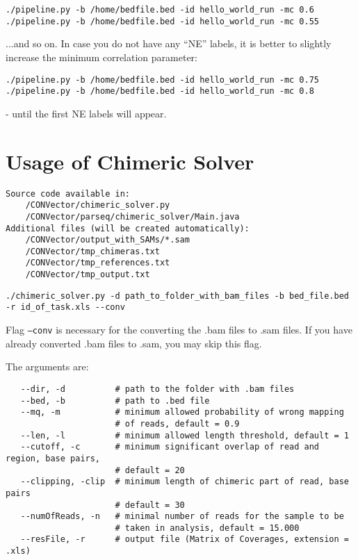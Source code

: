 \documentclass{article}
\begin{document}
\begin{lstlisting}[style=DOS, caption={Decreasing of correlation}]
./pipeline.py -b /home/bedfile.bed -id hello_world_run -mc 0.6
./pipeline.py -b /home/bedfile.bed -id hello_world_run -mc 0.55
\end{lstlisting}

...and so on. In case you do not have any ``NE'' labels, it is better to slightly increase the minimum correlation parameter:

\begin{lstlisting}[style=DOS, caption={Increasing of correlation}]
./pipeline.py -b /home/bedfile.bed -id hello_world_run -mc 0.75
./pipeline.py -b /home/bedfile.bed -id hello_world_run -mc 0.8
\end{lstlisting}
- until the first NE labels will appear.







\newpage

\section{Usage of Chimeric Solver}
\begin{verbatim}
Source code available in:
    /CONVector/chimeric_solver.py
    /CONVector/parseq/chimeric_solver/Main.java
Additional files (will be created automatically):
    /CONVector/output_with_SAMs/*.sam
    /CONVector/tmp_chimeras.txt
    /CONVector/tmp_references.txt
    /CONVector/tmp_output.txt
\end{verbatim}

\begin{lstlisting}[style=DOS, caption={Simple run of Chimeric Solver}]
./chimeric_solver.py -d path_to_folder_with_bam_files -b bed_file.bed -r id_of_task.xls --conv
\end{lstlisting}

Flag \texttt{--conv} is necessary for the converting the .bam files to .sam files. If you have already converted .bam files to .sam, you may skip this flag.

The arguments are:

\begin{verbatim}
   --dir, -d          # path to the folder with .bam files
   --bed, -b          # path to .bed file
   --mq, -m           # minimum allowed probability of wrong mapping
                      # of reads, default = 0.9
   --len, -l          # minimum allowed length threshold, default = 1
   --cutoff, -c       # minimum significant overlap of read and region, base pairs, 
                      # default = 20
   --clipping, -clip  # minimum length of chimeric part of read, base pairs
                      # default = 30
   --numOfReads, -n   # minimal number of reads for the sample to be 
                      # taken in analysis, default = 15.000
   --resFile, -r      # output file (Matrix of Coverages, extension = .xls)

\end{verbatim}
\end{document}
